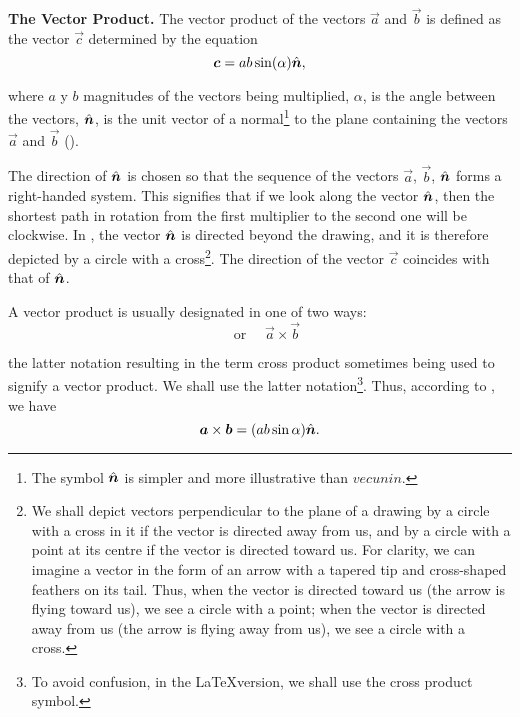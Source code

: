 \textbf{The Vector Product.} The vector product of the vectors $\vec{a}$ and $\vec{b}$ is defined as the vector $\vec{c}$ determined by the equation
\begin{equation}\label{eq:1_27}
\boldsymbol{c} = ab\sin(\alpha)\hat{\boldsymbol{n}},
\end{equation}

\noindent
where $a$ y $b$ magnitudes of the vectors being multiplied, $\alpha$, is the angle between the vectors, $\hat{\boldsymbol{n}}$, is the unit vector of a normal\footnote{The symbol $\hat{\boldsymbol{n}}$ is simpler and more illustrative than $vecuni{n}$.} to the plane containing the vectors $\vec{a}$ and $\vec{b}$ ().

The direction of $\hat{\boldsymbol{n}}$ is chosen so that the sequence of the vectors $\vec{a}$, $\vec{b}$, $\hat{\boldsymbol{n}}$ forms a right-handed system. This signifies that if we look along the vector $\hat{\boldsymbol{n}}$, then the shortest path in rotation from the first multiplier to the second one will be clockwise. In , the vector $\hat{\boldsymbol{n}}$ is directed beyond the drawing, and it is therefore depicted by a circle with a cross\footnote{We shall depict vectors perpendicular to the plane of a drawing by a circle with a cross in it if the vector is directed away from us, and by a circle with a point at its centre if the vector is directed toward us. For clarity, we can imagine a vector in the form of an arrow with a tapered tip and cross-shaped feathers on its tail. Thus, when the vector is directed toward us (the arrow is flying toward us), we see a circle with a point; when the vector is directed away from us (the arrow is flying away from us), we see a circle with a cross.}. The direction of the vector $\vec{c}$ coincides with that of $\hat{\boldsymbol{n}}$.


A vector product is usually designated in one of two ways:
\begin{equation*}
[\vec{a},\vec{b}]\quad\text{or }\quad \vec{a}\times\vec{b}
\end{equation*}

\noindent
the latter notation resulting in the term cross product sometimes being used to signify a vector product. We shall use the latter notation\footnote{To avoid confusion, in the \LaTeX version, we shall use the cross product symbol.}. Thus, according to , we have
\begin{equation}\label{eq:1_28}
\boldsymbol{a}\times\boldsymbol{b} = (ab\sin\alpha)\hat{\boldsymbol{n}}.
\end{equation}

